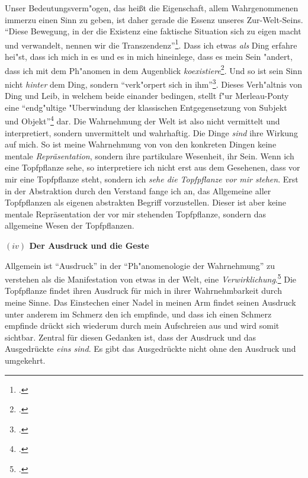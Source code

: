 \documentclass[a4paper, 12pt]{article}
\begin{document}
\begin{onehalfspace}
Unser Bedeutungsverm"ogen, das heißt die Eigenschaft, allem Wahrgenommenen immerzu einen Sinn zu geben, ist daher gerade die Essenz unseres Zur-Welt-Seins. "`Diese Bewegung, in der die Existenz eine faktische Situation sich zu eigen macht und verwandelt, nennen wir die Transzendenz"'\footnote{\Cite[Siehe][S. 202]{merleau1966phanomenologie}.}. Dass ich etwas \emph{als} Ding erfahre hei"st, dass ich mich in es und es in mich hineinlege, dass es mein Sein "andert, dass ich mit dem Ph"anomen in dem Augenblick \emph{koexistiere}\footnote{\Cite[Vgl.][S. 368]{merleau1966phanomenologie}.}. Und so ist sein Sinn nicht \emph{hinter} dem Ding, sondern "`verk"orpert sich in ihm"'\footnote{\Cite[Siehe][S. 370]{merleau1966phanomenologie}.}. Dieses Verh"altnis von Ding und Leib, in welchem beide einander bedingen, stellt f"ur Merleau-Ponty eine "`endg"ultige "Uberwindung der klassischen Entgegensetzung von Subjekt und Objekt"'\footnote{\Cite[Siehe][S. 207]{merleau1966phanomenologie}.} dar. Die Wahrnehmung der Welt ist also nicht vermittelt und interpretiert, sondern unvermittelt und wahrhaftig. Die Dinge \emph{sind} ihre Wirkung auf mich. So ist meine Wahrnehmung von von den konkreten Dingen keine mentale \emph{Repräsentation}, sondern ihre partikulare Wesenheit, ihr Sein. Wenn ich eine Topfpflanze sehe, so interpretiere ich nicht erst aus dem Gesehenen, dass vor mir eine Topfpflanze steht, sondern ich \emph{sehe die Topfpflanze vor mir stehen}. Erst in der Abstraktion durch den Verstand fange ich an, das Allgemeine aller Topfpflanzen als eigenen abstrakten Begriff vorzustellen. Dieser ist aber keine mentale Repräsentation der vor mir stehenden Topfpflanze, sondern das allgemeine Wesen der Topfpflanzen.

\vspace{5mm}

\noindent\textbf{$(iv)$ Der Ausdruck und die Geste}

\noindent Allgemein ist "`Ausdruck"' in der "`Ph"anomenologie der Wahrnehmung"' zu verstehen als die Manifestation von etwas in der Welt, eine \emph{Verwirklichung}.\footnote{\Cite[Vgl.][S. 217]{merleau1966phanomenologie}.} Die Topfpflanze findet ihren Ausdruck für mich in ihrer Wahrnehmbarkeit durch meine Sinne. Das Einstechen einer Nadel in meinen Arm findet seinen Ausdruck unter anderem im Schmerz den ich empfinde, und dass ich einen Schmerz empfinde drückt sich wiederum durch mein Aufschreien aus und wird somit sichtbar. Zentral für diesen Gedanken ist, dass der Ausdruck und das Ausgedrückte \emph{eins sind}. Es gibt das Ausgedrückte nicht ohne den Ausdruck und umgekehrt. 


\end{onehalfspace}
\end{document}
